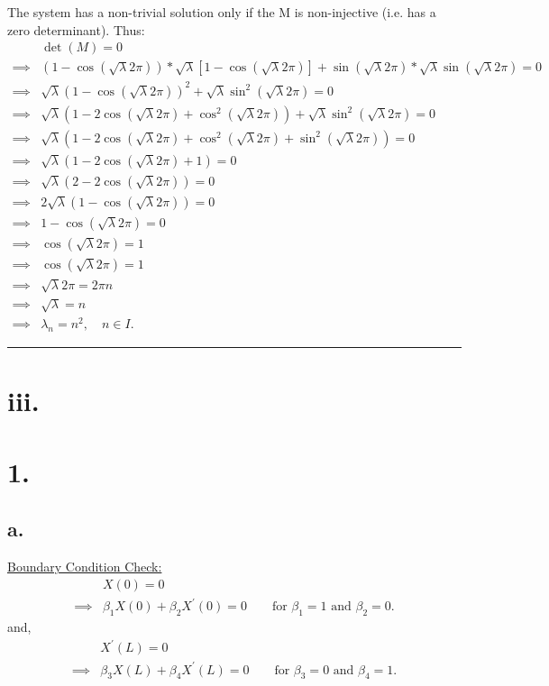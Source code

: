 \documentclass{article}
\begin{document}
The system has a non-trivial solution only if the M is non-injective (i.e. has a zero determinant). Thus:
\begin{align*}
  &\det(M) = 0 \\
  \implies& (1 - \cos(\sqrt{\lambda} 2\pi)) * \sqrt{\lambda} [1 - \cos(\sqrt{\lambda} 2\pi)] 
  +
  \sin(\sqrt{\lambda} 2\pi) * \sqrt{\lambda} \sin(\sqrt{\lambda} 2\pi)
  = 0 \\
  \implies& \sqrt{\lambda}(1 - \cos(\sqrt{\lambda} 2\pi))^2 
  +
  \sqrt{\lambda} \sin^2(\sqrt{\lambda} 2\pi)
  = 0 \\
  \implies& \sqrt{\lambda}(1 - 2\cos(\sqrt{\lambda} 2\pi) + \cos^2(\sqrt{\lambda} 2\pi))
  +
  \sqrt{\lambda} \sin^2(\sqrt{\lambda} 2\pi)
  = 0 \\
  \implies& \sqrt{\lambda}(1 - 2\cos(\sqrt{\lambda} 2\pi) + \cos^2(\sqrt{\lambda} 2\pi) + \sin^2(\sqrt{\lambda} 2\pi))
  = 0 \\
  \implies& \sqrt{\lambda}(1 - 2\cos(\sqrt{\lambda} 2\pi) + 1)
  = 0 \\
  \implies& \sqrt{\lambda}(2 - 2\cos(\sqrt{\lambda} 2\pi))
  = 0 \\
  \implies& 2\sqrt{\lambda}(1 - \cos(\sqrt{\lambda} 2\pi))
  = 0 \\
  \implies& 1 - \cos(\sqrt{\lambda} 2\pi) = 0 \\
  \implies& \cos(\sqrt{\lambda} 2\pi) = 1 \\
  \implies& \cos(\sqrt{\lambda} 2\pi) = 1 \\
  \implies& \sqrt{\lambda} 2\pi = 2\pi n \\
  \implies& \sqrt{\lambda} = n \\
  \implies& \lambda_n = n^2, \quad n \in I.
\end{align*}

\noindent\rule{\textwidth}{1pt}
\newpage

\section*{iii.}
\section*{1.}
\subsection*{a.}
\noindent
\underline{Boundary Condition Check:}
\begin{align*}
  &X(0) = 0 \\
  \implies&  \beta_1 X(0) + \beta_2 X^{\prime}(0) = 0 \qquad \text{for } \beta_1 = 1 \text{ and } \beta_2 = 0.
\end{align*}
and,
\begin{align}
  &X^{\prime}(L) = 0 \nonumber \\
  \implies&  \beta_3 X(L) + \beta_4 X^{\prime}(L) = 0 \qquad \text{for } \beta_3 = 0 \text{ and } \beta_4 = 1. \label{1.a.1}
\end{align}
\end{document}
